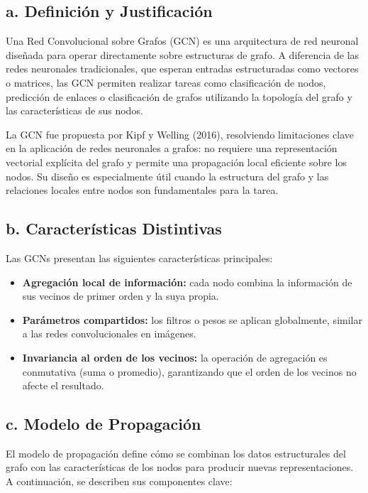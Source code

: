 \documentclass[11pt]{article} %
\begin{document}
\subsection{a. Definición y Justificación}

Una Red Convolucional sobre Grafos (GCN) es una arquitectura de red neuronal diseñada para operar directamente sobre estructuras de grafo. A diferencia de las redes neuronales tradicionales, que esperan entradas estructuradas como vectores o matrices, las GCN permiten realizar tareas como clasificación de nodos, predicción de enlaces o clasificación de grafos utilizando la topología del grafo y las características de sus nodos.

La GCN fue propuesta por Kipf y Welling (2016), resolviendo limitaciones clave en la aplicación de redes neuronales a grafos: no requiere una representación vectorial explícita del grafo y permite una propagación local eficiente sobre los nodos. Su diseño es especialmente útil cuando la estructura del grafo y las relaciones locales entre nodos son fundamentales para la tarea.

\subsection{b. Características Distintivas}

Las GCNs presentan las siguientes características principales:

\begin{itemize}
    \item \textbf{Agregación local de información:} cada nodo combina la información de sus vecinos de primer orden y la suya propia.
    \item \textbf{Parámetros compartidos:} los filtros o pesos se aplican globalmente, similar a las redes convolucionales en imágenes.
    \item \textbf{Invariancia al orden de los vecinos:} la operación de agregación es conmutativa (suma o promedio), garantizando que el orden de los vecinos no afecte el resultado.
\end{itemize}


\subsection{c. Modelo de Propagación}

El modelo de propagación define cómo se combinan los datos estructurales del grafo con las características de los nodos para producir nuevas representaciones. A continuación, se describen sus componentes clave:
\end{document}
